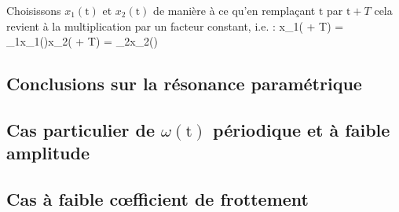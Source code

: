 Choisissons $x_{1}(\mathrm{t})$ et $x_{2}(\mathrm{t})$ de mani\`{e}re \`{a} ce qu'en rempla\c{c}ant $\mathrm{t}$ par $\mathrm{t} + T$ cela revient \`{a} la multiplication par un facteur constant, i.e. :
\benn
	x_{1}( + T) = \Pi_{1}x_{1}()\text{, }x_{2}( + T) = \Pi_{2}x_{2}()
\eenn

\subsection{Conclusions sur la r\'{e}sonance param\'{e}trique}

\subsection{Cas particulier de $\omega(\mathrm{t})$ p\'{e}riodique et \`{a} faible amplitude}

\subsection{Cas \`{a} faible c{\oe}fficient de frottement}
